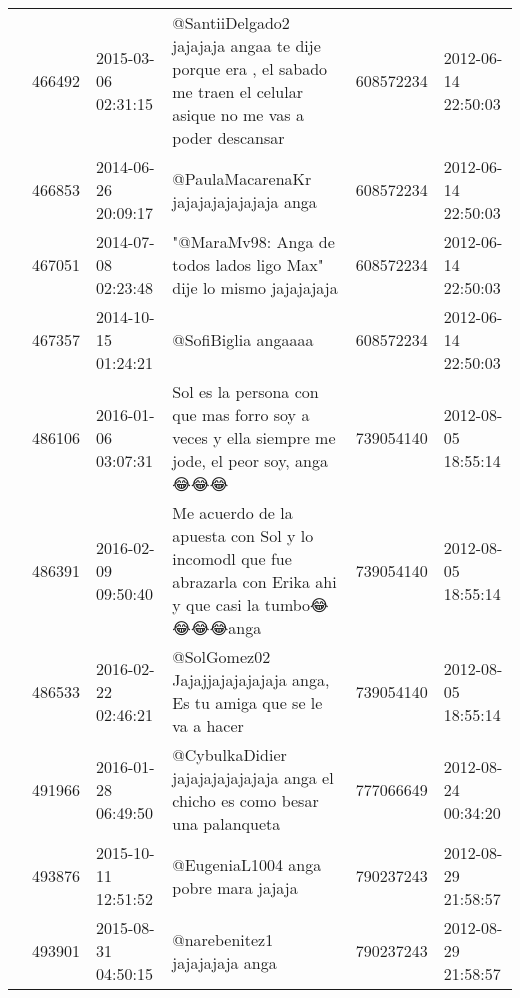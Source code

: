 \begin{tabular}{llllrl}
           & 466492  & 2015-03-06 02:31:15 &                         @SantiiDelgado2 jajajaja angaa te dije porque era , el sabado me traen el celular asique no me vas a poder descansar &   608572234 & 2012-06-14 22:50:03 \\
           & 466853  & 2014-06-26 20:09:17 &                                                                                                      @PaulaMacarenaKr  jajajajajajajaja anga &   608572234 & 2012-06-14 22:50:03 \\
           & 467051  & 2014-07-08 02:23:48 &                                                                           "@MaraMv98: Anga de todos lados ligo Max" dije lo mismo jajajajaja &   608572234 & 2012-06-14 22:50:03 \\
           & 467357  & 2014-10-15 01:24:21 &                                                                                                                          @SofiBiglia angaaaa &   608572234 & 2012-06-14 22:50:03 \\
           & 486106  & 2016-01-06 03:07:31 &                                                Sol es la persona con que mas forro soy a veces y ella siempre me jode, el peor soy, anga 😂😂😂 &   739054140 & 2012-08-05 18:55:14 \\
           & 486391  & 2016-02-09 09:50:40 &                                   Me acuerdo de la apuesta con Sol y lo incomodl que fue abrazarla con Erika ahi y que casi la tumbo😂😂😂😂anga &   739054140 & 2012-08-05 18:55:14 \\
           & 486533  & 2016-02-22 02:46:21 &                                                                         @SolGomez02 Jajajjajajajajaja anga, Es tu amiga que se le va a hacer &   739054140 & 2012-08-05 18:55:14 \\
           & 491966  & 2016-01-28 06:49:50 &                                                                  @CybulkaDidier jajajajajajajaja anga el chicho es como besar una palanqueta &   777066649 & 2012-08-24 00:34:20 \\
           & 493876  & 2015-10-11 12:51:52 &                                                                                                         @EugeniaL1004 anga pobre mara jajaja &   790237243 & 2012-08-29 21:58:57 \\
           & 493901  & 2015-08-31 04:50:15 &                                                                                                                @narebenitez1 jajajajaja anga &   790237243 & 2012-08-29 21:58:57 \\

\end{tabular}

